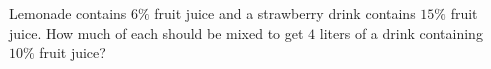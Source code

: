 Lemonade contains $6\%$ fruit juice and a strawberry drink contains $15\%$ fruit juice. How much of each should be mixed to get $4$ liters of a drink containing $10\%$ fruit juice?
